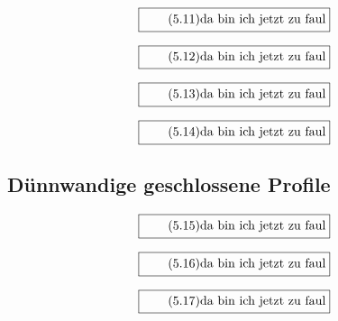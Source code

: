 \documentclass[11pt]{article}
\newcommand{\1}{ {\mathds{1}} }
\begin{document}
		\begin{equation}
			\boxed{
				\tag{5.11}
				\begin{split}
					\text{da bin ich jetzt zu faul}
				\end{split}
			}
		\end{equation}

		\begin{equation}
			\boxed{
				\tag{5.12}
				\begin{split}
					\text{da bin ich jetzt zu faul}
				\end{split}
			}
		\end{equation}

		\begin{equation}
			\boxed{
				\tag{5.13}
				\begin{split}
					\text{da bin ich jetzt zu faul}
				\end{split}
			}
		\end{equation}

		\begin{equation}
			\boxed{
				\tag{5.14}
				\begin{split}
					\text{da bin ich jetzt zu faul}
				\end{split}
			}
		\end{equation}

		\subsection{Dünnwandige geschlossene Profile}

		\begin{equation}
			\boxed{
				\tag{5.15}
				\begin{split}
					\text{da bin ich jetzt zu faul}
				\end{split}
			}
		\end{equation}

		\begin{equation}
			\boxed{
				\tag{5.16}
				\begin{split}
					\text{da bin ich jetzt zu faul}
				\end{split}
			}
		\end{equation}

		\begin{equation}
			\boxed{
				\tag{5.17}
				\begin{split}
					\text{da bin ich jetzt zu faul}
				\end{split}
			}
		\end{equation}
\end{document}
